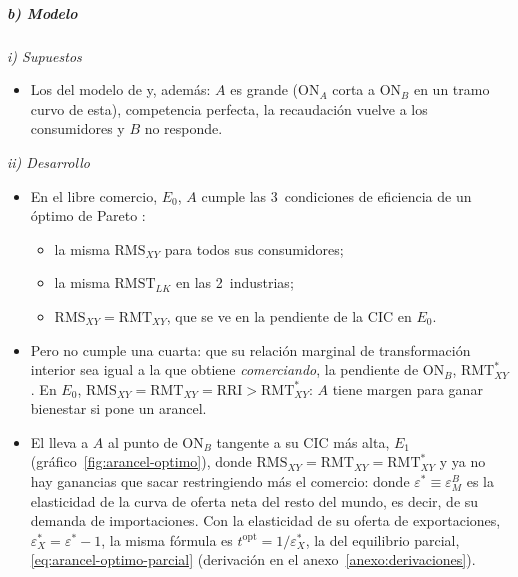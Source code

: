 \documentclass[11pt]{article}
\begin{document}
\subparagraph{b) Modelo}

\hspace*{3.6em}\emph{i) Supuestos}

\begin{itemize}
\item Los del modelo de  y, además: $A$ es grande (ON$_A$ corta a ON$_B$ en un tramo curvo de esta), competencia perfecta, la recaudación vuelve a los consumidores y $B$ no responde.
\end{itemize}

\hspace*{3.6em}\emph{ii) Desarrollo}

\begin{itemize}
\item En el libre comercio, $E_0$, $A$ cumple las 3~condiciones de eficiencia de un óptimo de Pareto :
  \begin{itemize}
  \item la misma $\mathrm{RMS}_{XY}$ para todos sus consumidores;
  \item la misma $\mathrm{RMST}_{LK}$ en las 2~industrias;
  \item $\mathrm{RMS}_{XY}=\mathrm{RMT}_{XY}$, que se ve en la pendiente de la CIC en $E_0$.
  \end{itemize}
\item Pero no cumple una cuarta: que su relación marginal de transformación interior sea igual a la que obtiene \emph{comerciando}, la pendiente de ON$_B$, $\mathrm{RMT}^*_{XY}$. En $E_0$, $\mathrm{RMS}_{XY}=\mathrm{RMT}_{XY}=\mathrm{RRI}>\mathrm{RMT}^*_{XY}$: $A$ tiene margen para ganar bienestar si pone un arancel.
\item El  lleva a $A$ al punto de ON$_B$ tangente a su CIC más alta, $E_1$ (gráfico~\ref{fig:arancel-optimo}), donde $\mathrm{RMS}_{XY}=\mathrm{RMT}_{XY}=\mathrm{RMT}^*_{XY}$ y ya no hay ganancias que sacar restringiendo más el comercio:
  donde $\varepsilon^*\equiv\varepsilon^B_M$ es la elasticidad de la curva de oferta neta del resto del mundo, es decir, de su demanda de importaciones. Con la elasticidad de su oferta de exportaciones, $\varepsilon^*_X=\varepsilon^*-1$, la misma fórmula es $t^{\mathrm{opt}}=1/\varepsilon^*_X$, la del equilibrio parcial, \eqref{eq:arancel-optimo-parcial} (derivación en el anexo~\ref{anexo:derivaciones}).

\end{itemize}
\end{document}
